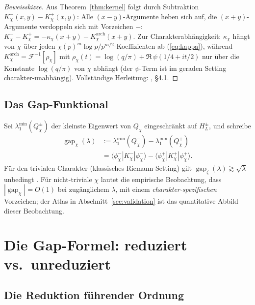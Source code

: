 \documentclass[10pt,twocolumn]{article}
\theoremstyle{definition}
\theoremstyle{remark}
\newcommand{\gap}{\operatorname{gap}}
\newcommand{\chifn}{\chi}
\begin{document}
\begin{proof}[Beweisskizze]
Aus Theorem~\ref{thm:kernel} folgt durch Subtraktion
$K_\chi^-(x,y)-K_\chi^+(x,y)$: Alle $(x-y)$-Argumente heben sich auf,
die $(x+y)$-Argumente verdoppeln sich mit Vorzeichen $-$:
$K_\chi^- - K_\chi^+ = -\kappa_\chi(x+y) - K^{\mathrm{arch}}_\chi(x+y)$.
Zur Charakterabhängigkeit: $\kappa_\chi$ hängt von $\chifn$ über jeden
$\chifn(p)^m\log p / p^{m/2}$-Koeffizienten ab (\eqref{eq:kappa}),
während $K^{\mathrm{arch}}_\chi=\mathcal{F}^{-1}[\rho_\chi]$ mit
$\rho_\chi(t)=\log(q/\pi)+\Re\,\psi(1/4+it/2)$ nur über die Konstante
$\log(q/\pi)$ von $\chifn$ abhängt (der $\psi$-Term ist im geraden
Setting charakter-unabhängig). Vollständige Herleitung:
\cite{AnalyticKernel}, \S4.1.
\end{proof}

\subsection{Das Gap-Funktional}

Sei $\lambda_1^{\min}(Q_{\chifn}^\pm)$ der kleinste Eigenwert
von $Q_{\chifn}$ eingeschränkt auf $H_L^\pm$, und schreibe
\begin{equation}
\label{eq:gap-def}
\begin{aligned}
  \gap_{\chifn}(\lambda)
    &:=\lambda_1^{\min}(Q_{\chifn}^-)
      -\lambda_1^{\min}(Q_{\chifn}^+)\\
    &=\langle\phi_{\chifn}^-|K_{\chifn}^-|\phi_{\chifn}^-\rangle
      -\langle\phi_{\chifn}^+|K_{\chifn}^+|\phi_{\chifn}^+\rangle.
\end{aligned}
\end{equation}
Für den trivialen Charakter (klassisches Riemann-Setting) gilt $\gap_\zeta
(\lambda)\gtrsim\sqrt{\lambda}$ unbedingt \cite{RH_II}. Für
nicht-triviale $\chifn$ lautet die empirische Beobachtung, dass
$|\gap_{\chifn}|=O(1)$ bei zugänglichem $\lambda$, mit
einem \emph{charakter-spezifischen} Vorzeichen; der Atlas in
Abschnitt~\ref{sec:validation} ist das quantitative Abbild dieser
Beobachtung.

\section{Die Gap-Formel: reduziert vs.\ unreduziert}
\label{sec:formula}

\subsection{Die Reduktion führender Ordnung}
\label{sec:formula-reduced}
\end{document}
